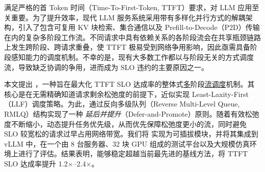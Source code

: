 满足严格的首 Token 时间（Time-To-First-Token, TTFT）要求，对 LLM 应用至关重要。为了提升效率，现代 LLM 服务系统采用带有多样化并行方式的解耦架构，引入了包含可复用 KV 块检索、集合通信以及 Prefill-to-Decode（P2D）传输在内的复杂多阶段工作流。不同请求中具有依赖关系的各阶段流会在共享瓶颈链路上发生跨阶段、跨请求重叠，使 TTFT 极易受到网络争用影响，因此亟需具备阶段感知能力的调度机制。不幸的是，现有大多数工作都以与阶段无关的方式调度流，导致缺乏协调的争用，进而成为 SLO 违约的主要原因之一。

本文提出 \sys，一种旨在最大化 TTFT SLO 达成率的整体式\underline{多}阶段\underline{流}\underline{调度}机制。其核心是在无需精确知道请求剩余松弛度的前提下，近似实现 Least-Laxity-First（LLF）调度策略。为此，\sys 通过反向多级队列（Reverse Multi-Level Queue, RMLQ）结构实现了一种 \emph{延后并提升}（Defer-and-Promote）原则。随着有效松弛度不断缩小，\sys 动态提升任务优先级，从而优先保障松弛度更小的流，同时避免 SLO 较宽松的请求过早占用网络带宽。我们将 \sys 实现为可插拔模块，并将其集成到 vLLM 中，在一个由 8 台服务器、32 块 GPU 组成的测试平台以及大规模仿真环境上进行了评估。结果表明，\sys 能够稳定超越当前最先进的基线方法，将 TTFT SLO 达成率提升 1.2$\times$--2.4$\times$。

